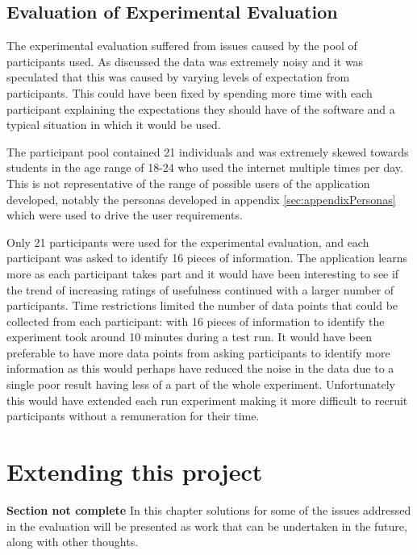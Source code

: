 \documentclass[authoryearcitations]{UoYCSproject}
\begin{document}
\section{Evaluation of Experimental Evaluation}
\label{sec:evalExperimentalEvaluation}

The experimental evaluation suffered from issues caused by the pool of participants used. As discussed the data was extremely noisy and it was speculated that this was caused by varying levels of expectation from participants. This could have been fixed by spending more time with each participant explaining the expectations they should have of the software and a typical situation in which it would be used. 

The participant pool contained 21 individuals and was extremely skewed towards students in the age range of 18-24 who used the internet multiple times per day. This is not representative of the range of possible users of the application developed, notably the personas developed in appendix \ref{sec:appendixPersonas} which were used to drive the user requirements.

Only 21 participants were used for the experimental evaluation, and each participant was asked to identify 16 pieces of information. The application learns more as each participant takes part and it would have been interesting to see if the trend of increasing ratings of usefulness continued with a larger number of participants. Time restrictions limited the number of data points that could be collected from each participant: with 16 pieces of information to identify the experiment took around 10 minutes during a test run. It would have been preferable to have more data points from asking participants to identify more information as this would perhaps have reduced the noise in the data due to a single poor result having less of a part of the whole experiment. Unfortunately this would have extended each run experiment making it more difficult to recruit participants without a remuneration for their time.


\newpage

\chapter{Extending this project}
\label{sec:extending}
{\bf Section not complete}
In this chapter solutions for some of the issues addressed in the evaluation will be presented as work that can be undertaken in the future, along with other thoughts.
\end{document}
